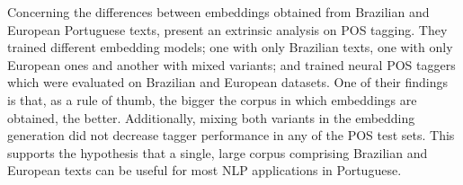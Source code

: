 Concerning the differences between embeddings obtained from Brazilian and European Portuguese texts, \cite{Fonseca2016} present an extrinsic analysis on POS tagging. They trained different embedding models; one with only Brazilian texts, one with only European ones and another with mixed variants; and trained neural POS taggers which were evaluated on Brazilian and European datasets. One of their findings is that, as a rule of thumb, the bigger the corpus in which embeddings are obtained, the better. Additionally, mixing both variants in the embedding generation did not decrease tagger performance in any of the POS test sets. This supports the hypothesis that a single, large corpus comprising Brazilian and European texts can be useful for most NLP applications in Portuguese.